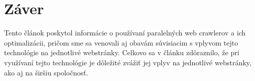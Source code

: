 \documentclass[10pt,twoside,slovak,a4paper]{article}
\begin{document}
\section{Záver}

Tento článok poskytol informácie o používaní paralelných web crawlerov a ich optimalizácii, pričom sme sa venovali aj obavám súvisiacim s vplyvom tejto technológie na jednotlivé webstránky. Celkovo sa v článku zdôraznilo, že pri využívaní tejto technológie je dôležité zvážiť jej vplyv na jednotlivé webstránky, ako aj na širšiu spoločnosť.

\newpage



\end{document}
